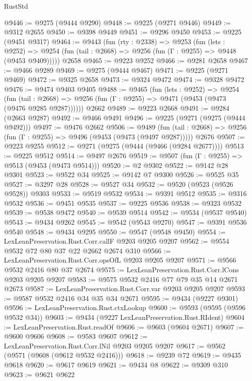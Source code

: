 \begin{lexlean}{RustStd}
\begin{coremodule}
@9446 := @9275 (@9444 @9290)
@9448 := @9225 (@9271 @9446)
@9449 := @9312 @2655
@9450 := @9398 @9449
@9451 := @9296 @9450
@9453 := @9225 (@9451 @9317)
@9464 := @9443
    (fun (rty : @2338) =>
    @9253
      (fun (lets : @9252) =>
      @9254 (fun (tail : @2668) => @9256 (fun (Γ : @9255) => @9448 (@9453 @9409)))))
    @2658
@9465 := @9223 @9252
@9466 := @9281 @2658
@9467 := @9466 @9289
@9469 := @9275 (@9444 @9467)
@9471 := @9225 (@9271 @9469)
@9472 := @9325 @2658
@9473 := @9324 @9472
@9474 := @9328 @9472
@9476 := @9474 @9403 @9405
@9488 := @9465
    (fun (lets : @9252) =>
    @9254
      (fun (tail : @2668) => @9256 (fun (Γ : @9255) => @9471 (@9453 (@9473 (@9476 @9285 @9287))))))
    @2662
@9489 := @9223 @2668
@9491 := @9284 (@2663 @9287)
@9492 := @9466 @9491
@9496 := @9225 (@9271 (@9275 (@9444 @9492)))
@9497 := @9476 @2662
@9506 := @9489
    (fun (tail : @2668) => @9256 (fun (Γ : @9255) => @9496 (@9453 (@9473 (@9497 @9287)))))
    @2676
@9507 := @9223 @9255
@9512 := @9271 (@9275 (@9444 (@9466 (@9284 @2677))))
@9513 := @9225 @9512
@9514 := @9497 @2676
@9519 := @9507 (fun (Γ : @9255) => @9513 (@9453 (@9473 @9514)))
@9520 := @2 @9302
@9522 := @9142 @28 @9301
@9523 := @9522 @34
@9525 := @9142 @7 @9300
@9526 := @9525 @35
@9527 := @3297 @28
@9528 := @9527 @34
@9532 := @9520 (@9523 (@9526 @9528)) @9303
@9533 := @9519 @9532
@9534 := @9391 @9512
@9535 := @9316 @9532
@9536 := @9451 @9535
@9537 := @9225 @9536
@9538 := @9323 @9532
@9539 := @9538 @9472
@9540 := @9539 @9514
@9542 := @9534 (@9537 @9540)
@9543 := @9434 @9262
@9545 := @9542 (@9543 @9270)
@9547 := @9391 @9536 @9540
@9548 := @9434 @9295
@9550 := @9547 (@9548 @9450)
@9554 := LexLeanPreservation.Rust.Corr.callF @9203 @9205 @9207
@9562 := @9554 @9532 @72 @80 @37 @22 @2662 @2674 @310
@9566 := LexLeanPreservation.Rust.Corr.opsOfL @9203 @9205 @9207
@9571 := @9566 @9532 @2416 @80 @37 @2674
@9575 := LexLeanPreservation.Rust.Corr.lCons @9203 @9205 @9207
@9583 := @9575 @9532 @2416 @77 @79 @35 @14 @2671 @2673
@9587 := LexLeanPreservation.Rust.Corr.var @9203 @9205 @9207
@9593 := @9587 @9532 @2416 @34 @35 @34 @2671
@9595 := @9434 (@9227 @9301)
@9596 := LexLeanPreservation.Rust.ctxLookup
@9600 := @9593 (@9595 (@9596 @9532 @34))
@9603 := @9434 (@9227 LexLeanPreservation.Rust.RIdent)
@9604 := LexLeanPreservation.Rust.readOf
@9606 := @9603 (@9604 @2671)
@9607 := @9600 @9606
@9608 := @9583 @9607
@9612 := LexLeanPreservation.Rust.Corr.lNil @9203 @9205 @9207
@9617 := @9562 (@9571 (@9608 (@9612 @9532 @2416)))
@9618 := @9239 @72
@9619 := @9435 @9618
@9620 := @9617 @9619
@9621 := @9434 @8
@9622 := @9309 @310
@9623 := @9621 @9622

\end{coremodule}
\end{lexlean}
